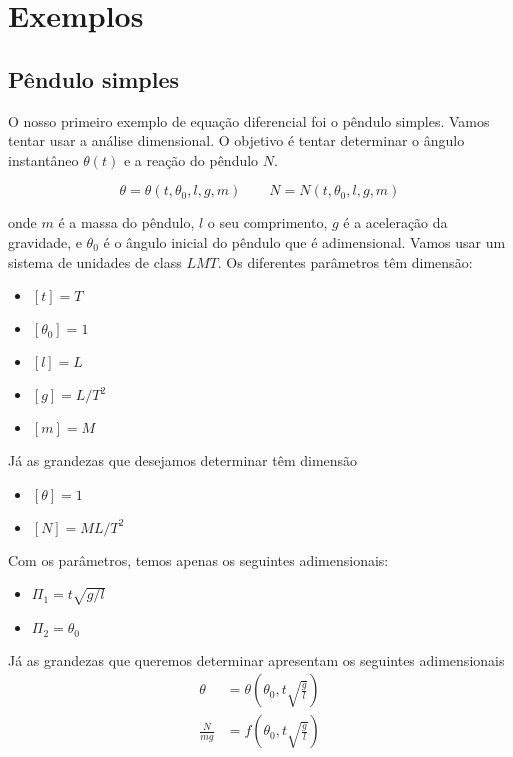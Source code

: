\chapter{Exemplos}

\section{Pêndulo simples}

O nosso primeiro exemplo de equação diferencial foi o pêndulo simples. Vamos tentar usar a análise dimensional. O objetivo é tentar determinar o ângulo instantâneo $\theta(t)$ e a reação do pêndulo $N$.

\[
\theta = \theta(t, \theta_0, l, g, m) \qquad N = N(t, \theta_0, l, g, m)
\]

onde $m$ é a massa do pêndulo, $l$ o seu comprimento, $g$ é a aceleração da gravidade, e $\theta_0$ é o ângulo inicial do pêndulo que é adimensional. Vamos usar um sistema de unidades de class $LMT$. Os diferentes parâmetros têm dimensão:

\begin{itemize}
\item $[t] = T$
\item $[\theta_0] = 1$
\item $[l] = L$
\item $[g] = L/T^2$
\item $[m] = M$
\end{itemize}
Já as grandezas que desejamos determinar têm dimensão
\begin{itemize}
\item $[\theta] = 1$
\item $[N] = ML/T^2$
\end{itemize}

Com os parâmetros, temos apenas os seguintes adimensionais:
\begin{itemize}
\item $\Pi_1 = t\sqrt{g/l}$
\item $\Pi_2 = \theta_0$
\end{itemize}

Já as grandezas que queremos determinar apresentam os seguintes adimensionais
\[
\begin{aligned}
  \theta &= \theta\left(\theta_0, t\sqrt{ \frac{g}{l} }\right) \\
  \frac{N}{mg} &= f\left(\theta_0, t\sqrt{ \frac{g}{l} }\right) \\
\end{aligned}
\]

